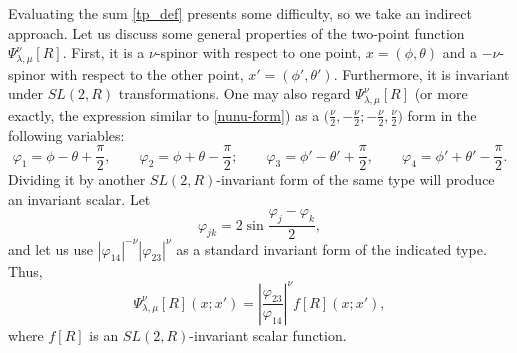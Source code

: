 \documentclass[11pt]{article}
\newcommand{\vp}{\varphi}
\newcommand{\RR}{\mathbb{R}}
\DeclareMathOperator{\SL}{SL}
\def\widetilde#1{#1}%
\def\SL{SL}
\def\RR{R}
\begin{document}
Evaluating the sum \eqref{tp_def} presents some difficulty, so we take an indirect approach. Let us discuss some general properties of the two-point function $\Psi^{\nu}_{\lambda,\mu}[R]$. First, it is a $\nu$-spinor with respect to one point, $x=(\phi,\theta)$ and a $-\nu$-spinor with respect to the other point, $x'=(\phi',\theta')$. Furthermore, it is invariant under $\widetilde{\SL}(2,\RR)$ transformations. One may also regard $\Psi^{\nu}_{\lambda,\mu}[R]$ (or more exactly, the expression similar to \eqref{nunu-form}) as a $\bigl(\frac{\nu}{2},-\frac{\nu}{2}; -\frac{\nu}{2},\frac{\nu}{2}\bigr)$ form in the following variables:
\begin{equation}
\vp_1=\phi-\theta+\frac{\pi}{2},\qquad
\vp_2=\phi+\theta-\frac{\pi}{2};\qquad
\vp_3=\phi'-\theta'+\frac{\pi}{2},\qquad
\vp_4=\phi'+\theta'-\frac{\pi}{2}.
\end{equation}
Dividing it by another $\widetilde{\SL}(2,\RR)$-invariant form of the same type will produce an invariant scalar. Let
\begin{equation}
\vp_{jk}=2\sin\frac{\vp_j-\vp_k}{2},
\end{equation}
and let us use $|\vp_{14}|^{-\nu}|\vp_{23}|^{\nu}$ as a standard invariant form of the indicated type. Thus,
\begin{equation}\label{tPsi_f}
\Psi^{\nu}_{\lambda,\mu}[R](x;x')
=\left|\frac{\vp_{23}}{\vp_{14}}\right|^{\nu} f[R](x;x'),
\end{equation}
where $f[R]$ is an $\widetilde{\SL}(2,\RR)$-invariant scalar function.
\end{document}
